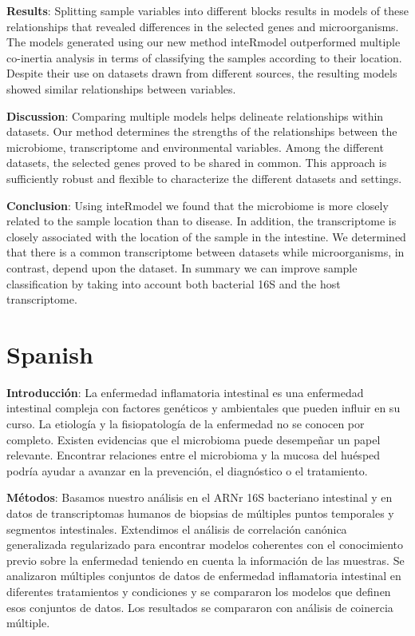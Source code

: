 \documentclass[
  12pt,
  a4paper,
  twoside,
  openright]{book}
\begin{document}
\textbf{Results}: Splitting sample variables into different blocks results in models of these relationships that revealed differences in the selected genes and microorganisms.
The models generated using our new method inteRmodel outperformed multiple co-inertia analysis in terms of classifying the samples according to their location.
Despite their use on datasets drawn from different sources, the resulting models showed similar relationships between variables.

\textbf{Discussion}:
Comparing multiple models helps delineate relationships within datasets.
Our method determines the strengths of the relationships between the microbiome, transcriptome and environmental variables.
Among the different datasets, the selected genes proved to be shared in common.
This approach is sufficiently robust and flexible to characterize the different datasets and settings.

\textbf{Conclusion}: Using inteRmodel we found that the microbiome is more closely related to the sample location than to disease.
In addition, the transcriptome is closely associated with the location of the sample in the intestine.
We determined that there is a common transcriptome between datasets while microorganisms, in contrast, depend upon the dataset.
In summary we can improve sample classification by taking into account both bacterial 16S and the host transcriptome.

\hypertarget{spanish}{%
\section*{Spanish}\label{spanish}}

\textbf{Introducción}: La enfermedad inflamatoria intestinal es una enfermedad intestinal compleja con factores genéticos y ambientales que pueden influir en su curso.
La etiología y la fisiopatología de la enfermedad no se conocen por completo.
Existen evidencias que el microbioma puede desempeñar un papel relevante.
Encontrar relaciones entre el microbioma y la mucosa del huésped podría ayudar a avanzar en la prevención, el diagnóstico o el tratamiento.

\textbf{Métodos}: Basamos nuestro análisis en el ARNr 16S bacteriano intestinal y en datos de transcriptomas humanos de biopsias de múltiples puntos temporales y segmentos intestinales.
Extendimos el análisis de correlación canónica generalizada regularizado para encontrar modelos coherentes con el conocimiento previo sobre la enfermedad teniendo en cuenta la información de las muestras.
Se analizaron múltiples conjuntos de datos de enfermedad inflamatoria intestinal en diferentes tratamientos y condiciones y se compararon los modelos que definen esos conjuntos de datos.
Los resultados se compararon con análisis de coinercia múltiple.
\end{document}

